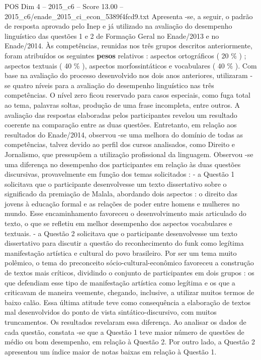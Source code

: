 \begin{textsample}{POS Dim 4 – 2015\_c6 – Score 13.00 – 2015\_c6/enade\_2015\_ci\_econ\_5389f4fcd9.txt}
Apresenta -se, a seguir, o padrão de resposta aprovado pelo Inep e já utilizado na avaliação do desempenho linguístico das questões 1 e 2 de Formação Geral no Enade/2013 e no Enade/2014.
Às competências, reunidas nos três grupos descritos anteriormente, foram atribuídos os seguintes \textbf{pesos} relativos : aspectos ortográficos ( 20 \% ) ; aspectos textuais ( 40 \% ), aspectos morfossintáticos e vocabulares ( 40 \% ).
Com base na avaliação do processo desenvolvido nos dois anos anteriores, utilizaram -se quatro níveis para a avaliação do desempenho linguístico nas três competências.
O nível zero ficou reservado para casos especiais, como fuga total ao tema, palavras soltas, produção de uma frase incompleta, entre outros.
A avaliação das respostas elaboradas pelos participantes revelou um resultado coerente na comparação entre as duas questões.
Entretanto, em relação aos resultados do Enade/2014, observou -se uma melhora do domínio de todas as competências, talvez devido ao perfil dos cursos analisados, como Direito e Jornalismo, que pressupõem a utilização profissional da linguagem.
Observou -se uma diferença no desempenho dos participantes em relação às duas questões discursivas, provavelmente em função dos temas solicitados : - a Questão 1 solicitava que o participante desenvolvesse um texto dissertativo sobre o significado da premiação de Malala, abordando dois aspectos : o direito das jovens à educação formal e as relações de poder entre homens e mulheres no mundo.
Esse encaminhamento favoreceu o desenvolvimento mais articulado do texto, o que se refletiu em melhor desempenho dos aspectos vocabulares e textuais. - a Questão 2 solicitava que o participante desenvolvesse um texto dissertativo para discutir a questão do reconhecimento do funk como legítima manifestação artística e cultural do povo brasileiro.
Por ser um tema muito polêmico, o tema do preconceito sócio-cultural-econômico favoreceu a construção de textos mais críticos, dividindo o conjunto de participantes em dois grupos : os que defendiam esse tipo de manifestação artística como legítima e os que a criticavam de maneira veemente, chegando, inclusive, a utilizar muitos termos de baixo calão.
Essa última atitude teve como consequência a elaboração de textos mal desenvolvidos do ponto de vista sintático-discursivo, com muitos truncamentos.
Os resultados revelaram essa diferença.
Ao analisar os dados de cada questão, constata -se que a Questão 1 teve maior número de questões de médio ou bom desempenho, em relação à Questão 2.
Por outro lado, a Questão 2 apresentou um índice maior de notas baixas em relação à Questão 1.

\end{textsample}
